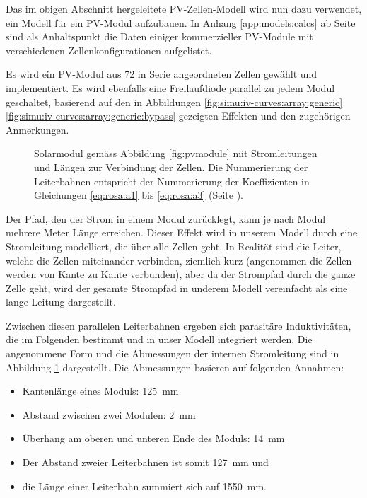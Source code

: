 Das im obigen Abschnitt hergeleitete PV-Zellen-Modell wird nun dazu verwendet,
ein Modell f\"ur ein  PV-Modul aufzubauen. In Anhang \ref{app:models:calcs} ab
Seite  \pageref{app:models:calcs}  sind  als Anhaltspunkt  die  Daten  einiger
kommerzieller PV-Module mit verschiedenen Zellenkonfigurationen aufgelistet.

Es     wird    ein     PV-Modul     aus    72     in    Serie     angeordneten
Zellen    gew\"ahlt     und    implementiert. Es    wird     ebenfalls    eine
Freilaufdiode    parallel    zu     jedem    Modul    geschaltet,    basierend
auf     den      in     Abbildungen     \ref{fig:simu:iv-curves:array:generic}
\ref{fig:simu:iv-curves:array:generic:bypass}   gezeigten  Effekten   und  den
zugeh\"origen Anmerkungen.

\begin{figure}
    \centering
    
    \caption[PV-Modul, Modell f\"ur den Strompfad]{
        Solarmodul  gem\"ass Abbildung  \ref{fig:pvmodule} mit  Stromleitungen
        und  L\"angen   zur  Verbindung   der  Zellen. Die   Nummerierung  der
        Leiterbahnen   entspricht    der   Nummerierung    der   Koeffizienten
        in   Gleichungen   \ref{eq:rosa:a1}    bis   \ref{eq:rosa:a3}   (Seite
        \pageref{eq:rosa:a1}).%
    }
    \label{fig:pvmodule:wiring}
    \vspace*{-3em}
\end{figure}

Der  Pfad, den  der Strom  in  einem Modul  zur\"ucklegt, kann  je nach  Modul
mehrere Meter L\"ange  erreichen.  Dieser Effekt wird in  unserem Modell durch
eine Stromleitung modelliert, die \"uber  alle Zellen geht. In Realit\"at sind
die Leiter, welche die Zellen miteinander verbinden, ziemlich kurz (angenommen
die Zellen werden  von Kante zu Kante verbunden), aber  da der Strompfad durch
die ganze Zelle geht, wird der gesamte Strompfad in underem Modell vereinfacht
als eine lange Leitung dargestellt.

Zwischen   diesen   parallelen    Leiterbahnen   ergeben   sich   parasit\"are
Induktivit\"aten, die  im Folgenden  bestimmt und  in unser  Modell integriert
werden.  Die  angenommene Form und  die Abmessungen der  internen Stromleitung
sind  in  Abbildung   \ref{fig:pvmodule:wiring}  dargestellt. Die  Abmessungen
basieren auf folgenden Annahmen:

\begin{itemize}
    \tightlist
    \item
        Kantenl\"ange eines Moduls: \SI{125}{\milli\meter}
    \item
        Abstand zwischen zwei Modulen: \SI{2}{\milli\meter}
    \item
        \"Uberhang      am      oberen      und     unteren      Ende      des
        Moduls: \SI{14}{\milli\meter}
    \item
        Der Abstand zweier Leiterbahnen ist somit \SI{127}{\milli\meter} und
    \item
        die     L\"ange     einer     Leiterbahn     summiert     sich     auf
        \SI{1550}{\milli\meter}.
\end{itemize}


